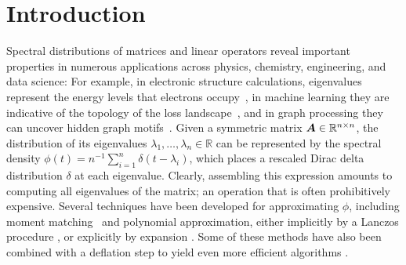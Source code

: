 \section{Introduction}
\label{sec:introduction}

Spectral distributions of matrices and linear operators reveal important properties in numerous applications across physics, chemistry, engineering, and data science: For example, in electronic structure calculations, eigenvalues represent the energy levels that electrons occupy~\cite{drabold-1993-maximum-entropy, ducastelle-1970-moments-developments, haydock-1972-electronic-structure, lin-2017-randomized-estimation}, in machine learning they are indicative of the topology of the loss landscape~\cite{ghorbani-2019-investigation-neural, yao-2020-pyhessian-neural}, and in graph processing they can uncover hidden graph motifs~\cite{huang-2021-density-states}. Given a symmetric matrix $\boldsymbol{A} \in \mathbb{R}^{n \times n}$, the distribution of its eigenvalues $\lambda_1, \dots, \lambda_n \in \mathbb{R}$ can be represented by the spectral density $\phi(t) = n^{-1} \sum_{i=1}^{n} \delta(t - \lambda_i)$, which places a rescaled Dirac delta distribution $\delta$ at each eigenvalue. Clearly, assembling this expression amounts to computing all eigenvalues of the matrix; an operation that is often prohibitively expensive. Several techniques have been developed for approximating $\phi$, including moment matching~\cite{cohen-steiner-2018-approximating-spectrum, braverman-2022-sublinear-time} and polynomial approximation, either implicitly by a Lanczos procedure \cite{lin-2016-approximating-spectral, chen-2021-analysis-stochastic}, or explicitly by expansion \cite{weisse-2006-kernel-polynomial, lin-2016-approximating-spectral}. Some of these methods have also been combined with a deflation step to yield even more efficient algorithms \cite{lin-2017-randomized-estimation, bhattacharjee-2024-improved-spectral}.

